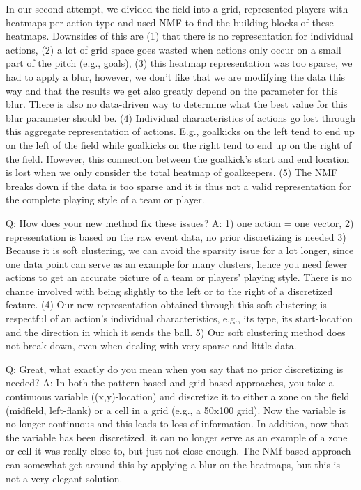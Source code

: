 \documentclass[runningheads]{llncs}
\begin{document}
In our second attempt, we divided the field into a grid, represented players with heatmaps per action type and used NMF to find the building blocks of these heatmaps. Downsides of this are (1) that there is no representation for individual actions, (2) a lot of grid space goes wasted when actions only occur on a small part of the pitch (e.g., goals), (3) this heatmap representation was too sparse, we had to apply a blur, however, we don't like that we are modifying the data this way and that the results we get also greatly depend on the parameter for this blur. There is also no data-driven way to determine what the best value for this blur parameter should be. (4) Individual characteristics of actions go lost through this aggregate representation of actions. E.g., goalkicks on the left tend to end up on the left of the field while goalkicks on the right tend to end up on the right of the field. However, this connection between the goalkick's start and end location is lost when we only consider the total heatmap of goalkeepers. (5) The NMF breaks down if the data is too sparse and it is thus not a valid representation for the complete playing style of a team or player.

Q: How does your new method fix these issues?
A: 1) one action = one vector, 2) representation is based on the raw event data, no prior discretizing is needed 3) Because it is soft clustering, we can avoid the sparsity issue for a lot longer, since one data point can serve as an example for many clusters, hence you need fewer actions to get an accurate picture of a team or players' playing style. There is no chance involved with being slightly to the left or to the right of a discretized feature. (4) Our new representation obtained through this soft clustering is respectful of an action's individual characteristics, e.g., its type, its start-location and the direction in which it sends the ball. 5) Our soft clustering method does not break down, even when dealing with very sparse and little data.


Q: Great, what exactly do you mean when you say that no prior discretizing is needed?
A: In both the pattern-based and grid-based approaches, you take a continuous variable ((x,y)-location) and discretize it to either a zone on the field (midfield, left-flank) or a cell in a grid (e.g., a 50x100 grid). Now the variable is no longer continuous and this leads to loss of information. In addition, now that the variable has been discretized, it can no longer serve as an example of a zone or cell it was really close to, but just not close enough. The NMf-based approach can somewhat get around this by applying a blur on the heatmaps, but this is not a very elegant solution.
\end{document}
